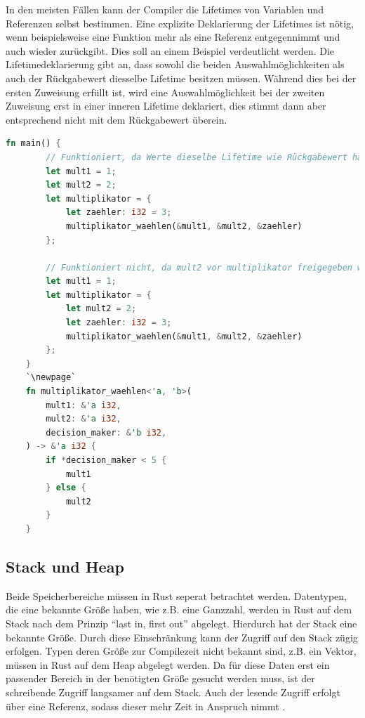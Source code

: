 \documentclass[11pt,a4paper, ngerman]{article}
\begin{document}
In den meisten Fällen kann der Compiler die Lifetimes von Variablen und Referenzen selbst bestimmen. Eine explizite Deklarierung der Lifetimes ist nötig, wenn beispielsweise eine Funktion mehr als eine Referenz entgegennimmt und auch wieder zurückgibt. Dies soll an einem Beispiel verdeutlicht werden. Die Lifetimedeklarierung  gibt an, dass sowohl die beiden Auswahlmöglichkeiten als auch der Rückgabewert diesselbe Lifetime besitzen müssen. Während dies bei der ersten Zuweisung erfüllt ist, wird eine Auswahlmöglichkeit bei der zweiten Zuweisung erst in einer inneren Lifetime deklariert, dies stimmt dann aber entsprechend nicht mit dem Rückgabewert überein.

\begin{lstlisting}[language=rust, caption={Lifetime Beispiele \cite{RustLifetimeEx}}]
    fn main() {
        // Funktioniert, da Werte dieselbe Lifetime wie Rückgabewert haben
        let mult1 = 1;
        let mult2 = 2;
        let multiplikator = {
            let zaehler: i32 = 3;
            multiplikator_waehlen(&mult1, &mult2, &zaehler)
        };

        // Funktioniert nicht, da mult2 vor multiplikator freigegeben wird
        let mult1 = 1;
        let multiplikator = {
            let mult2 = 2;
            let zaehler: i32 = 3;
            multiplikator_waehlen(&mult1, &mult2, &zaehler)
        };
    }
    `\newpage`
    fn multiplikator_waehlen<'a, 'b>(
        mult1: &'a i32,
        mult2: &'a i32,
        decision_maker: &'b i32,
    ) -> &'a i32 {
        if *decision_maker < 5 {
            mult1
        } else {
            mult2
        }
    }
\end{lstlisting}

\subsection{Stack und Heap}
Beide Speicherbereiche müssen in Rust seperat betrachtet werden. Datentypen, die eine bekannte Größe haben, wie z.B. eine Ganzzahl, werden in Rust auf dem Stack nach dem Prinzip ``last in, first out'' abgelegt. Hierdurch hat der Stack eine bekannte Größe. Durch diese Einschränkung kann der Zugriff auf den Stack zügig erfolgen. Typen deren Größe zur Compilezeit nicht bekannt sind, z.B. ein Vektor, müssen in Rust auf dem Heap abgelegt werden. Da für diese Daten erst ein passender Bereich in der benötigten Größe gesucht werden muss, ist der schreibende Zugriff langsamer auf dem Stack. Auch der lesende Zugriff erfolgt über eine Referenz, sodass dieser mehr Zeit in Anspruch nimmt \cite{StackHeap} \cite[S. 233 ff.]{SK19}. 
\end{document}
